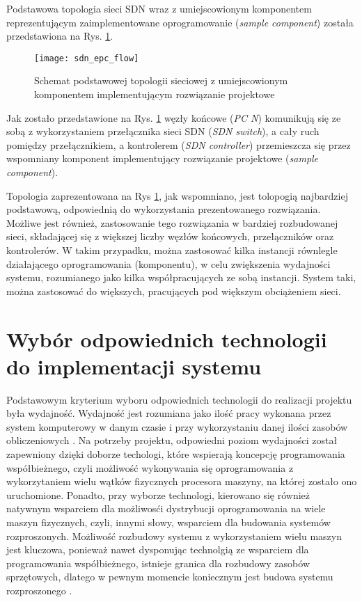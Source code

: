 Podstawowa topologia sieci SDN wraz z umiejscowionym komponentem reprezentującym
zaimplementowane oprogramowanie (\textit{sample component}) została
przedstawiona na Rys. \ref{fig:sdn_epc_flow}. 

\begin{figure}[h]
\centering
\texttt{[image: sdn\_epc\_flow]}
\caption{Schemat podstawowej topologii sieciowej z umiejscowionym komponentem
  implementującym rozwiązanie projektowe}
\label{fig:sdn_epc_flow}
\end{figure}

Jak zostało przedstawione na Rys. \ref{fig:sdn_epc_flow} węzły końcowe
(\textit{PC N}) komunikują się ze sobą z wykorzystaniem przełącznika sieci SDN
(\textit{SDN switch}), a cały ruch pomiędzy przełącznikiem, a kontrolerem
(\textit{SDN controller}) przemieszcza się przez wspomniany komponent
implementujący rozwiązanie projektowe (\textit{sample component}).

Topologia zaprezentowana na Rys \ref{fig:sdn_epc_flow}, jak wspomniano, jest
tolopogią najbardziej podstawową, odpowiednią do wykorzystania prezentowanego
rozwiązania. Możliwe jest również, zastosowanie tego rozwiązania w bardziej
rozbudowanej sieci, składającej się z większej liczby węzłów końcowych, 
przełączników oraz kontrolerów. W takim przypadku, można zastosować kilka
instancji równlegle działającego oprogramowania (komponentu), w celu
zwiększenia wydajności systemu, rozumianego jako kilka współpracujących ze sobą
instancji. System taki, można zastosować do większych, pracujących pod większym
obciążeniem sieci. 

\section{Wybór odpowiednich technologii do implementacji systemu}

Podstawowym kryterium wyboru odpowiednich technologii do realizacji projektu
była wydajność. Wydajność jest rozumiana jako ilość pracy wykonana przez system
komputerowy w danym czasie i przy wykorzystaniu danej ilości zasobów
obliczeniowych \cite{distrforfunandprof}. Na potrzeby projektu, odpowiedni
poziom wydajności został zapewniony dzięki doborze techologi, które wspierają
koncepcję programowania współbieżnego, czyli możliwość wykonywania się
oprogramowania z wykorzytaniem wielu wątków fizycznych procesora maszyny, na
której zostało ono uruchomione. Ponadto, przy wyborze technologi, kierowano się
również natywnym wsparciem dla możliwosći dystrybucji oprogramowania na wiele
maszyn fizycznych, czyli, innymi słowy, wsparciem dla budowania systemów
rozproszonych. Możliwość rozbudowy systemu z wykorzystaniem wielu maszyn jest
kluczowa, ponieważ nawet dysponując technolgią ze wsparciem dla programowania
współbieżnego, istnieje granica dla rozbudowy zasobów sprzętowych, dlatego w
pewnym momencie koniecznym jest budowa systemu rozproszonego
\cite{distrforfunandprof}. 


